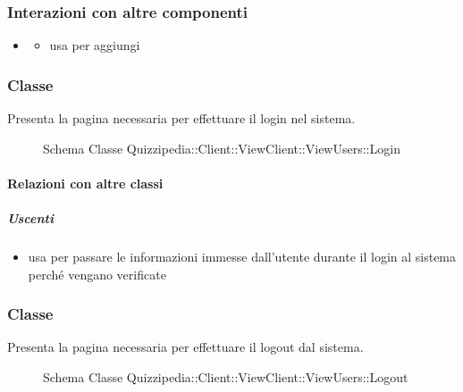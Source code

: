 \subsubsection{Interazioni con altre componenti}
\begin{itemize}
\item {}
\begin{itemize}
\item usa  per aggiungi
\end{itemize}
\end{itemize}
\subsubsection{Classe }
Presenta la pagina necessaria per effettuare il login nel sistema.
\begin{figure}[H]
\centering
\noindent{}
\caption[Schema Classe Login]{Schema Classe Quizzipedia::Client::ViewClient::ViewUsers::Login}
\end{figure}
\paragraph{Relazioni con altre classi}
\subparagraph{Uscenti}
\begin{itemize}
\item usa  per passare le informazioni immesse dall'utente durante il login al sistema perché vengano verificate
\end{itemize}
\subsubsection{Classe }
Presenta la pagina necessaria per effettuare il logout dal sistema.
\begin{figure}[H]
\centering
\noindent{}
\caption[Schema Classe Logout]{Schema Classe Quizzipedia::Client::ViewClient::ViewUsers::Logout}
\end{figure}
